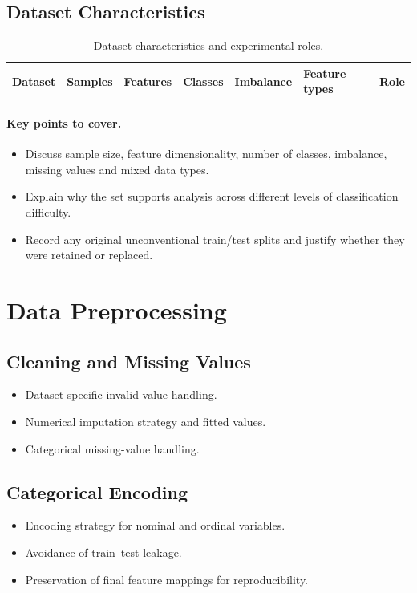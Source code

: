 \documentclass[]{UCD_CS_MSc_AAI_Report}
\newcommand{\sectionbrief}{\paragraph{Key points to cover.}}
\begin{document}
\subsection{Dataset Characteristics}

\begin{table}[ht]
    \centering
    \caption{Dataset characteristics and experimental roles.}
    \label{tab:datasets}
    \begin{tabular}{lrrrrll}
        \toprule
        Dataset & Samples & Features & Classes & Imbalance & Feature types & Role \\
        \midrule
        \bottomrule
    \end{tabular}
\end{table}

\sectionbrief
\begin{itemize}
    \item Discuss sample size, feature dimensionality, number of classes, imbalance, missing values and mixed data types.
    \item Explain why the set supports analysis across different levels of classification difficulty.
    \item Record any original unconventional train/test splits and justify whether they were retained or replaced.
\end{itemize}

\section{Data Preprocessing}
\label{sec:method-preprocessing}

\subsection{Cleaning and Missing Values}
\begin{itemize}
    \item Dataset-specific invalid-value handling.
    \item Numerical imputation strategy and fitted values.
    \item Categorical missing-value handling.
\end{itemize}

\subsection{Categorical Encoding}
\begin{itemize}
    \item Encoding strategy for nominal and ordinal variables.
    \item Avoidance of train--test leakage.
    \item Preservation of final feature mappings for reproducibility.
\end{itemize}
\end{document}
